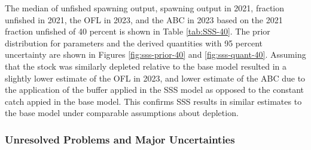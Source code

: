 \documentclass[11pt,
  english,
  letterpaper,
]{article}
\begin{document}
\leavevmode\tagmcend\tagstructend\par


The median of unfished spawning output, spawning output in 2021, fraction unfished in 2021, the OFL in 2023, and the ABC in 2023 based on the 2021 fraction unfished of 40 percent is shown in Table \ref{tab:SSS-40}. The prior distribution for parameters and the derived quantities with 95 percent uncertainty are shown in Figures \ref{fig:sss-prior-40} and \ref{fig:sss-quant-40}. Assuming that the stock was similarly depleted relative to the base model resulted in a slightly lower estimate of the OFL in 2023, and lower estimate of the ABC due to the application of the buffer applied in the SSS model as opposed to the constant catch appied in the base model. This confirms SSS results in similar estimates to the base model under comparable assumptions about depletion.

\leavevmode\tagmcend\tagstructend\par


\hypertarget{unresolved-problems-and-major-uncertainties}{%
\subsubsection{Unresolved Problems and Major Uncertainties}\label{unresolved-problems-and-major-uncertainties}}

\leavevmode\tagmcend\tagstructend

\end{document}
